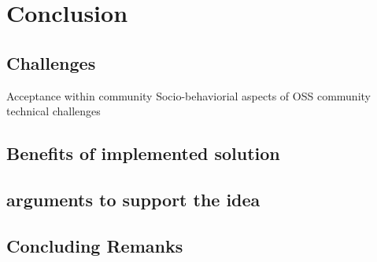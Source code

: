 \chapter{Conclusion}\label{chapter:Conclusion}

\section{Challenges}
Acceptance within community
Socio-behaviorial aspects of OSS community
technical challenges
\section{Benefits of implemented solution}
\section{arguments to support the idea}
\section{Concluding Remanks} 	
